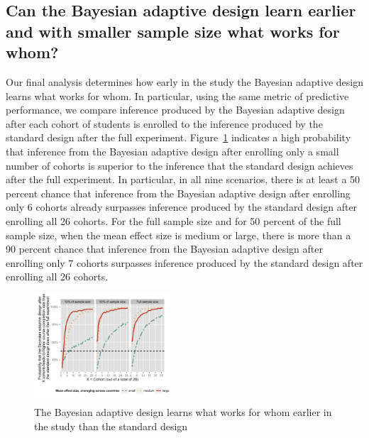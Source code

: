 \documentclass{acm_proc_article-sp}
\begin{document}
\subsection{Can the Bayesian adaptive design learn earlier and with smaller sample size what works for whom?}
Our final analysis determines how early in the study the Bayesian adaptive design learns what works for whom. In particular, using the same metric of predictive performance, we compare inference produced by the Bayesian adaptive design after each cohort of students is enrolled to the inference produced by the standard design after the full experiment. Figure~\ref{fig:6} indicates a high probability that inference from the Bayesian adaptive design after enrolling only a small number of cohorts is superior to the inference that the standard design achieves after the full experiment. In particular, in all nine scenarios, there is at least a 50 percent chance that inference from the Bayesian adaptive design after enrolling only 6 cohorts already surpasses inference produced by the standard design after enrolling all 26 cohorts. For the full sample size and for 50 percent of the full sample size, when the mean effect size is medium or large, there is more than a 90 percent chance that inference from the Bayesian adaptive design after enrolling only 7 cohorts surpasses inference produced by the standard design after enrolling all 26 cohorts. 

\begin{figure}
\centering
\includegraphics[width=0.45\textwidth]{fig6}
\caption{The Bayesian adaptive design learns what works for whom earlier in the study than the standard design}
\label{fig:6}
\end{figure}
\end{document}
